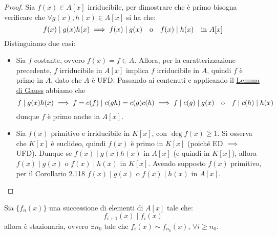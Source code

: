 \documentclass[11pt]{scrartcl}
\begin{document}
\begin{proof}
    Sia $f(x) \in A[x]$ irriducibile, per dimostrare che è primo bisogna verificare che $\forall g(x),h(x) \in A[x]$ si ha che:
    \[ f(x) \mid g(x)h(x) \implies f(x) \mid g(x) \quad \text o \quad f(x) \mid h(x) \quad \text{in $A[x]$}
        \]
    Distinguiamo due casi:
    \begin{itemize}
        \item Sia $f$ costante, ovvero $f(x) = f \in A$. Allora, per la caratterizzazione precedente, $f$ irriducibile in $A[x]$ implica $f$ irriducibile in $A$, quindi $f$ è primo in $A$, dato che $A$ è UFD. Passando ai contenuti e applicando il \hyperref[gauss]{Lemma di Gauss} abbiamo che
        \[ f \mid g(x)h(x) \implies f = c(f) \mid c(gh) = c(g)c(h) \implies f \mid c(g) \mid g(x) \quad \text o \quad f \mid c(h) \mid h(x)
            \]
        dunque $f$ è primo anche in $A[x]$.
        \item Sia $f(x)$ primitivo e irriducibile in $K[x]$, con $\deg f(x) \geq 1$. 
	Si osserva che $K[x]$ è euclideo, quindi $f(x)$ è primo in $K[x]$ (poiché ED $\implies$ UFD).
	Dunque se $f(x) \mid g(x)h(x)$ in $A[x]$ (e quindi in $K[x]$), allora $f(x) \mid g(x)$ o $f(x) \mid h(x)$ in $K[x]$. 
	Avendo supposto $f(x)$ primitivo, per il \hyperref[2.118]{Corollario 2.118} $f(x) \mid g(x)$ o $f(x) \mid h(x)$ in $A[x]$.
    \end{itemize}
\end{proof}

\begin{proposition}
    Sia $\{f_n(x)\}$ una successione di elementi di $A[x]$ tale che:
    \[ f_{i+1}(x) \mid f_i(x)
        \]
    allora è stazionaria, ovvero $\exists n_0$ tale che $f_i(x) \sim f_{n_0}(x)$, $\forall i \geq n_0$.
\end{proposition}
\end{document}
